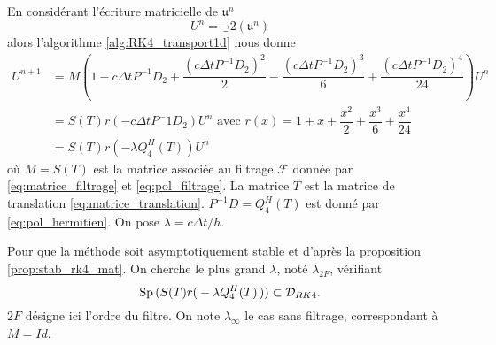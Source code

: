 En considérant l'écriture matricielle de $\mathfrak{u}^n$
\begin{equation}
U^n = \vec_2(\mathfrak{u}^n)
\end{equation}
alors l'algorithme \ref{alg:RK4_transport1d} nous donne
\begin{align*}
U^{n+1} & = M \left( 1 - c \Delta t P^{-1}D_2 + \dfrac{(c \Delta t P^{-1}D_2)^2}{2} - \dfrac{(c \Delta t P^{-1}D_2)^3}{6} + \dfrac{(c \Delta t P^{-1}D_2)^4}{24} \right) U^n \\
		& = S(T) r(- c \Delta t P^-1D_2) U^n \text{ avec } r(x)=1+x+\dfrac{x^2}{2}+\dfrac{x^3}{6}+\dfrac{x^4}{24}\\
		& = S(T) r \left( -\lambda Q_{4}^H(T) \right) U^n
\end{align*}
où $M=S(T)$ est la matrice associée au filtrage $\mathcal{F}$ donnée par \eqref{eq:matrice_filtrage} et \eqref{eq:pol_filtrage}. La matrice $T$ est la matrice de translation \ref{eq:matrice_translation}. $P^{-1}D = Q_4^H(T)$ est donné par \eqref{eq:pol_hermitien}. On pose $\lambda = c \Delta t / h$.

Pour que la méthode soit asymptotiquement stable et d'après la proposition \ref{prop:stab_rk4_mat}.
On cherche le plus grand $\lambda$, noté $\lambda_{2F}$, vérifiant
\begin{equation}
\text{Sp} \left( S(T) r \right( -\lambda Q_{4}^H(T) \left) \right) \subset \mathcal{D}_{RK4}.
\end{equation}
$2F$ désigne ici l'ordre du filtre. On note $\lambda_{\infty}$ le cas sans filtrage, correspondant à $M=Id$.

